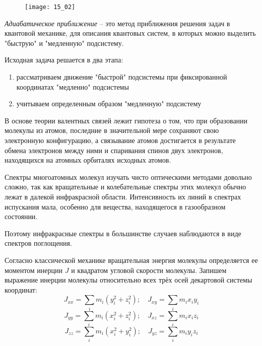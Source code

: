 \begin{figure}[h!]
    \center
    \texttt{[image: 15\_02]}
\end{figure}

\emph{Адиабатическое приближение} -- это метод приближения решения задач в 
квантовой механике, для описания квантовых систем, в которых можно выделить 
"быструю" и "медленную" подсистему. 

Исходная задача решается в два этапа:
\begin{enumerate}
    \item рассматриваем движение "быстрой" подсистемы при фиксированной 
        координатах "медленно" подсистемы
    \item учитываем определенным образом "медленную" подсистему
\end{enumerate}

В основе теории валентных связей лежит гипотеза о том, что при 
образовании молекулы из атомов, последние в значительной мере сохраняют 
свою электронную конфигурацию, а связывание атомов достигается в 
результате обмена электронов между ними и спаривания спинов двух 
электронов, находящихся на атомных орбиталях исходных атомов. 

Спектры многоатомных молекул изучать чисто оптическими методами
довольно сложно, так как вращательные и колебательные спектры этих
молекул обычно лежат в далекой инфракрасной области. Интенсивность их
линий в спектрах испускания мала, особенно для вещества, находящегося в
газообразном состоянии.

Поэтому инфракрасные спектры в большинстве случаев наблюдаются в
виде спектров поглощения.

Согласно классической механике вращательная энергия молекулы
определяется ее моментом инерции \( J \) и квадратом угловой скорости
молекулы. Запишем выражение инерции молекулы относительно всех трёх 
осей декартовой системы координат:
\[ 
	J_{xx} = \sum_i m_i\left( y^2_i + z^2_i \right);\quad
	J_{xy} = \sum_i m_i x_i y_i
\]
\[ 
	J_{yy} = \sum_i m_i\left( x^2_i + z^2_i \right);\quad
	J_{xz} = \sum_i m_i x_i z_i
\]
\[ 
	J_{zz} = \sum_i m_i\left( x^2_i + y^2_i \right);\quad
	J_{yz} = \sum_i m_i y_i z_i
\]

